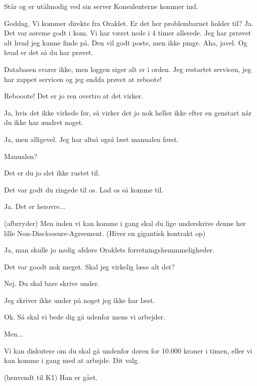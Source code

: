 \documentclass[a4paper,11pt]{article}
\begin{document}
 Står og er utålmodig ved sin server
\scene Konsulenterne kommer ind.
\begin{sketch}
 Goddag. Vi kommer direkte fra Oraklet. Er det her
problembarnet holder til?
 Ja. Det var søreme godt i kom. Vi har været nede i 4 timer
allerede. Jeg har prrøvet alt hvad jeg kunne finde på. Den vil godt
poste, men ikke pinge.
 Aha, javel. Og hvad er det så du har prøvet.

 Databasen svarer ikke, men loggen siger alt er i orden. Jeg restartet servicen, jeg har zappet servicen og jeg endda prøvet at reboote!

 Rebooote! Det er jo ren overtro at det virker.

 Ja, hvis det ikke virkede før, så virker det jo nok heller ikke efter en genstart når du ikke har ændret noget.

 Ja, men alligevel. Jeg har altså også læst manualen først.

 Manualen?

 Det er du jo slet ikke rustet til.

 Det var godt du ringede til os. Lad os så komme til.

 Ja. Det er herovre...

 (afbrryder) Men inden vi kan komme i gang skal du lige underskrive denne her lille Non-Discloosure-Agreement. (Hiver en gigantisk kontrakt op)

 Ja, man skulle jo nødig afsløre Oraklets forretningshemmmeligheder.


 Det var goodt nok meget. Skal jeg virkelig læse alt det?

 Nej. Du skal bare skrive under.

 Jeg skriver ikke under på noget jeg ikke har læst.

 Ok. Så skal vi bede dig gå udenfor mens vi arbejder.

 Men...

 Vi kan diskutere om du skal gå undenfor døren for 10.000 kroner i timen, eller vi kan komme i gang med at arbejde. Dit valg.


 (henvendt til K1) Han er gået.


\end{sketch}
\end{document}
